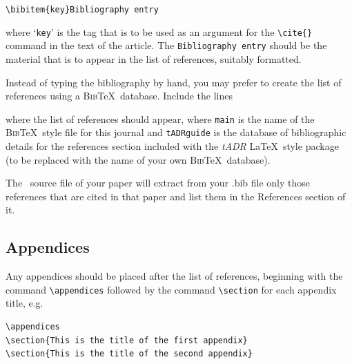 \documentclass{tADR2e}
\begin{document}
\noindent\verb"\bibitem{key}Bibliography entry"
\vspace{12pt}

\noindent where `{\tt key}' is the tag that is to be used as an argument for the \verb"\cite{}" command in the text of the article. The {\tt Bibliography entry} should be the material that is to appear in the list of references, suitably formatted.

Instead of typing the bibliography by hand, you may prefer to create the list of references using a \textsc{Bib}\TeX\ database. Include the lines \vspace{12pt}

\noindent\verb""
\newline\verb""
\vspace{12pt}

\noindent where the list of references should appear, where \texttt{main} is the name of the \textsc{Bib}\TeX\ style file for this journal and \texttt{tADRguide} is the database of bibliographic details for the references section included with the {\itshape tADR} \LaTeX\ style package (to be replaced with the name of your own \textsc{Bib}\TeX\ database).

The \LaTeXe\ source file of your paper will extract from your .bib file only those references that are cited in that paper and list them in the References section of it.


\subsection{Appendices}\label{appendices}

Any appendices should be placed after the list of references, beginning with the
command \verb"\appendices" followed by the command \verb"\section"
for each appendix title, e.g.
%
\begin{verbatim}
\appendices
\section{This is the title of the first appendix}
\section{This is the title of the second appendix}
\end{verbatim}
\end{document}
